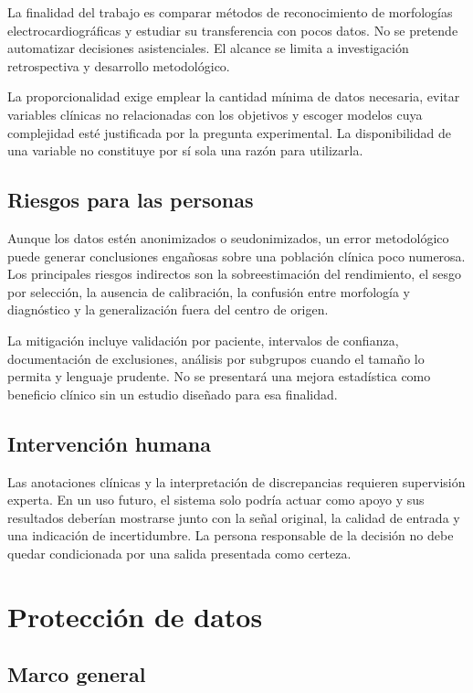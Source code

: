 La finalidad del trabajo es comparar métodos de reconocimiento de morfologías electrocardiográficas y estudiar su transferencia con pocos datos. No se pretende automatizar decisiones asistenciales. El alcance se limita a investigación retrospectiva y desarrollo metodológico.

La proporcionalidad exige emplear la cantidad mínima de datos necesaria, evitar variables clínicas no relacionadas con los objetivos y escoger modelos cuya complejidad esté justificada por la pregunta experimental. La disponibilidad de una variable no constituye por sí sola una razón para utilizarla.

\subsection{Riesgos para las personas}

Aunque los datos estén anonimizados o seudonimizados, un error metodológico puede generar conclusiones engañosas sobre una población clínica poco numerosa. Los principales riesgos indirectos son la sobreestimación del rendimiento, el sesgo por selección, la ausencia de calibración, la confusión entre morfología y diagnóstico y la generalización fuera del centro de origen.

La mitigación incluye validación por paciente, intervalos de confianza, documentación de exclusiones, análisis por subgrupos cuando el tamaño lo permita y lenguaje prudente. No se presentará una mejora estadística como beneficio clínico sin un estudio diseñado para esa finalidad.

\subsection{Intervención humana}

Las anotaciones clínicas y la interpretación de discrepancias requieren supervisión experta. En un uso futuro, el sistema solo podría actuar como apoyo y sus resultados deberían mostrarse junto con la señal original, la calidad de entrada y una indicación de incertidumbre. La persona responsable de la decisión no debe quedar condicionada por una salida presentada como certeza.

\section{Protección de datos}

\subsection{Marco general}


